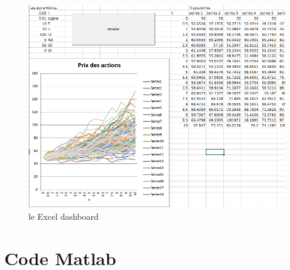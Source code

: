 \documentclass[a4paper,12pt]{scrartcl}
\begin{document}
\begin{figure}[h!]
  \begin{center}
    \includegraphics[width=14cm]{"graphiques/Capture.PNG"}
    \caption{le Excel dashboard}
    \label{fig:capture}
  \end{center}
\end{figure}


\section{Code Matlab}

\end{document}

